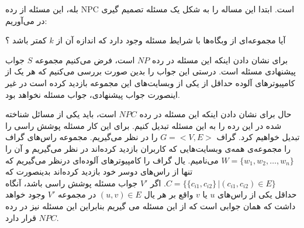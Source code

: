 \documentclass[]{article}
\begin{document}
بله، این مسئله از رده NPC است.
ابتدا این مساله را به شکل یک مسئله تصمیم گیری در می‌آوریم:

آیا مجموعه‌ای از وبگاه‌ها با شرایط مسئله وجود دارد که اندازه آن از $k$
کمتر باشد ؟

برای نشان دادن اینکه این مسئله در رده $NP$ است،
فرض می‌کنیم مجموعه $S$ جواب پیشنهادی مسئله است.
درستی این جواب را بدین صورت بررسی می‌کنیم که هر یک از کامپیوتر‌های آلوده حداقل
از یکی از وبسایت‌های این مجموعه بازدید کرده است
در غیر اینصورت جواب پیشنهادی، جواب مسئله نخواهد بود.

حال برای نشان دادن اینکه این مسئله در رده $NPC$ است،
باید یکی از مسائل شناخته شده در این رده را به این مسئله تبدیل کنیم.
برای این کار مسئله پوشش راسی را تبدیل خواهیم کرد.
گراف $G = <V, E>$ را در نظر می‌گیریم.
مجموعه راس‌های گراف را مجموعه‌ی همه‌ی وبسایت‌هایی که کاربران بازدید کرده‌اند در نظر می‌گیریم
و آن را $W = \lbrace w_1, w_2, \dots, w_n \rbrace$ می‌نامیم.
یال گراف را کامپیوترهای آلوده‌ای درنظر می‌گیریم که تنها از راس‌های دوسر خود بازدید کرده‌اند
بدینصورت که $C = \lbrace \lbrace c_{i1}, c_{i2} \rbrace \, | (c_{i1}, c_{i2}) \in E \rbrace$.
اگر $V'$ جواب مسئله پوشش راسی باشد،
آنگاه حداقل یکی از راس‌های $u$ یا $v$ واقع بر هر یال $(u, v) \in E$
در مجموعه $V'$ وجود خواهد داشت
که همان جوابی است که از این مسئله می گیریم بنابراین این مسئله نیز در رده $NPC$ قرار دارد. 
\end{document}

